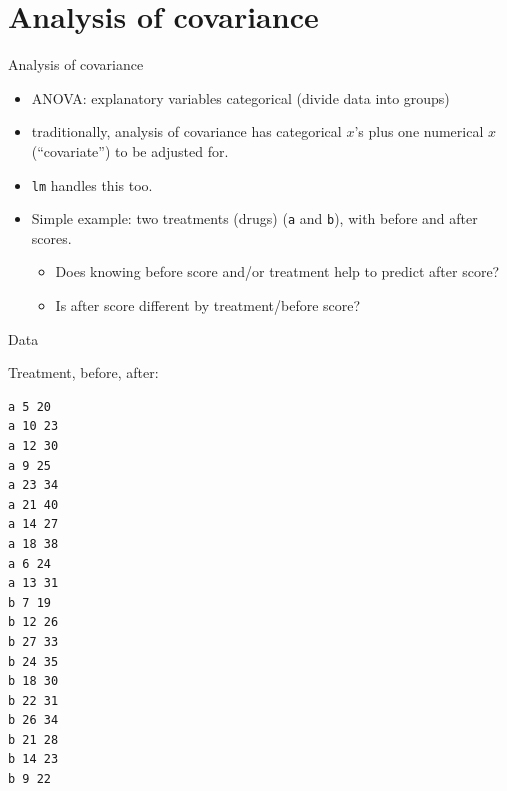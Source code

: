 \documentclass[unknownkeysallowed]{beamer}\usepackage[]{graphicx}\usepackage[]{color}
\begin{document}
\section{Analysis of covariance}
\frame{\sectionpage}



\begin{frame}[fragile]{Analysis of covariance}

  \begin{itemize}
  \item ANOVA: explanatory variables categorical (divide data into groups)
  \item traditionally, analysis of covariance has categorical $x$'s plus one numerical $x$ (``covariate'') to be adjusted for.
  \item \texttt{lm} handles this too.
  \item Simple example: two treatments (drugs) (\verb-a- and \verb-b-), with before and after scores. 
    \begin{itemize}
    \item 
Does knowing before score and/or treatment help to predict after score?
\item Is after score different by treatment/before score?
    \end{itemize}
  \end{itemize}

\end{frame}

\begin{frame}[fragile]{Data}

Treatment, before, after:

\begin{multicols}{2}

\begin{verbatim}
a 5 20
a 10 23
a 12 30
a 9 25
a 23 34
a 21 40
a 14 27
a 18 38
a 6 24
a 13 31
b 7 19
b 12 26
b 27 33
b 24 35
b 18 30
b 22 31
b 26 34
b 21 28
b 14 23
b 9 22
\end{verbatim}

  
\end{multicols}

\end{frame}
\end{document}
